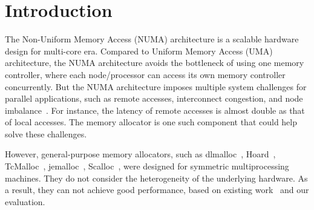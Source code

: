 
\section{Introduction}
\label{sec:intro}

The Non-Uniform Memory Access (NUMA) architecture is a scalable hardware design for multi-core era. Compared to Uniform Memory Access (UMA) architecture, the NUMA architecture avoids the bottleneck of using one memory controller, where each node/processor can access its own memory controller concurrently. But the NUMA architecture imposes multiple system challenges for parallel applications, such as remote accesses, interconnect congestion, and node imbalance~\cite{Blagodurov:2011:CNC:2002181.2002182}. For instance, the latency of remote accesses is almost double as that of local accesses. The memory allocator is one such component that could help solve these challenges.   

However, general-purpose memory allocators, such as dlmalloc~\cite{dlmalloc},  Hoard~\cite{Hoard}, TcMalloc~\cite{tcmalloc}, jemalloc~\cite{jemalloc}, Scalloc~\cite{Scalloc}, were designed for symmetric multiprocessing machines. They do not consider the heterogeneity of the underlying hardware. As a result, they can not achieve good performance, based on existing work~\cite{tcmallocnew, yang2019jarena} and our evaluation. 

